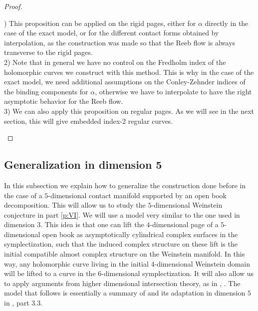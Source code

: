 \documentclass[../main.tex]{subfiles}
\begin{document}
\begin{proof}
\begin{remark}\label{r:lift_pages}
\text{}
) This proposition can be applied on the rigid pages, either for $\alpha$ directly in the case of the exact model, or for the different contact forms obtained by interpolation, as the construction was made so that the Reeb flow is always transverse to the rigid pages.\\
    2) Note that in general we have no control on the Fredholm index of the holomorphic curves we construct with this method. This is why in the case of the exact model, we need additional assumptions on the Conley-Zehnder indices of the binding components for $\alpha$, otherwise we have to interpolate to have the right asymptotic behavior for the Reeb flow.\\
    3) We can also apply this proposition on regular pages. As we will see in the next section, this will give embedded index-2 regular curves. 
\end{remark}
    
\end{proof}


\subsection{Generalization in dimension 5}

In this subsection we explain how to generalize the construction done before in the case of a $5$-dimensional contact manifold supported by an open book decomposition. This will allow us to study the $5$-dimensional Weinstein conjecture in part \ref{p:VI}. We will use a model very similar to the one used in dimension $3$. This idea is that one can lift the $4$-dimensional page of a $5$-dimensional open book as asymptotically cylindrical complex surfaces in the symplectization, such that the induced complex structure on these lift is the initial compatible almost complex structure on the Weinstein manifold. In this way, any holomorphic curve living in the initial 4-dimensional Weinstein domain will be lifted to a curve in the $6$-dimensional symplectization. It will also allow us to apply arguments from higher dimensional intersection theory, as in \cite{roux_cas_nodate}, \cite{moreno_holomorphic_2019}. The model that follows is essentially a summary of \cite{wendl_open_2009} and its adaptation in dimension $5$ in \cite{roux_cas_nodate}, part 3.3.\\
\end{document}

